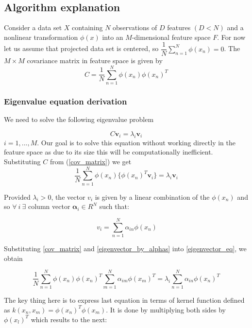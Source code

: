 \subsection{Algorithm explanation}
Consider a data set $X$ containing $N$ observations of $D$ features $(D < N)$ and a nonlinear transformation $\phi(x)$ into an $M$-dimensional feature space $F$. For now let us assume that projected data set is centered, so $\dfrac{1}{N}\sum_{n=1}^{N}{\phi(x_n)}=0$.
The $M \times M$ covariance matrix in feature space is given by
\begin{equation}\label{cov_matrix}
C =  \dfrac{1}{N}\sum_{n=1}^{N}{\phi(x_n)\phi(x_n)^T}
\end{equation}

\subsubsection{Eigenvalue equation derivation}
We need to solve the following eigenvalue problem

\begin{equation}\label{eigenvector_eq}
C \bm{v}_i = \lambda_i \bm{v}_i
\end{equation}
%
$i=1,...,M$. Our goal is to solve this equation without working directly in the feature space as due to its size this will be computationally inefficient. Substituting $C$ from (\ref{cov_matrix}) we get
%
\begin{equation}
\dfrac{1} {N} \sum_{n=1}^{N} {\phi(x_n)\{\phi(x_n)^T \bm{v}_i\}} = \lambda_i \bm{v}_i
\end{equation}

Provided $\lambda_i > 0$, the vector $v_i$ is given by a linear combination of the $\phi(x_n)$ and so $\forall\ i \ \exists$ column vector $\bm{\alpha}_i \in R^N$  such that:

\begin{equation}\label{eigenvector_by_alphas}
 \ v_i = \sum_{n=1}^{N}{\alpha_{in}\phi(x_n)}
\end{equation}

Substituting \eqref{cov_matrix} and \eqref{eigenvector_by_alphas} into \eqref{eigenvector_eq}, we obtain

\begin{equation}\label{big_equation}
\dfrac{1}{N}\sum_{n=1}^{N}{\phi(x_n)\phi(x_n)^T} \sum_{m=1}^{N}{\alpha_{im}\phi(x_m)^T} = \lambda_i \sum_{n=1}^{N}{\alpha_{in}\phi(x_n)^T}
\end{equation}

The key thing here is to express last equation in terms of kernel function defined as $k(x_n, x_m) = \phi(x_n)^T\phi(x_m)$. It is done by multiplying both sides by $\phi(x_l)^T$ which results to the next:

